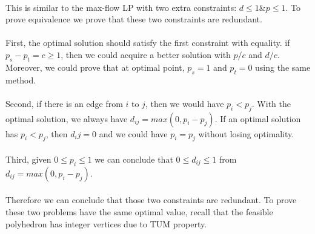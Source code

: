 \paragraph{}
This is similar to the max-flow LP with two extra constraints: $d \leq 1 \& p \leq 1$. To prove equivalence we prove that these two constraints are redundant.
\paragraph{}
First, the optimal solution should satisfy the first constraint with equality. if $p_s -p_t = c \geq 1$, then we could acquire a better solution with $p/c$ and $d/c$. Moreover, we could prove that at optimal point, $p_s =1$ and $p_t=0$ using the same method.
\paragraph{}
Second, if there is an edge from $i$ to $j$, then we would have $p_i < p_j$. With the optimal solution, we always have $d_{ij} =max(0, p_i - p_j)$. If an optimal solution has $p_i <p_j$, then $d_ij =0$ and we could have $p_i =p_j$ without losing optimality.
\paragraph{}
Third, given $0 \leq p_i \leq 1$ we can conclude that $0 \leq d_{ij} \leq 1$ from $d_{ij} =max(0, p_i - p_j)$. 
\paragraph{}
Therefore we can conclude that those two constraints are redundant. To prove these two problems have the same optimal value, recall that the feasible polyhedron has integer vertices due to TUM property.